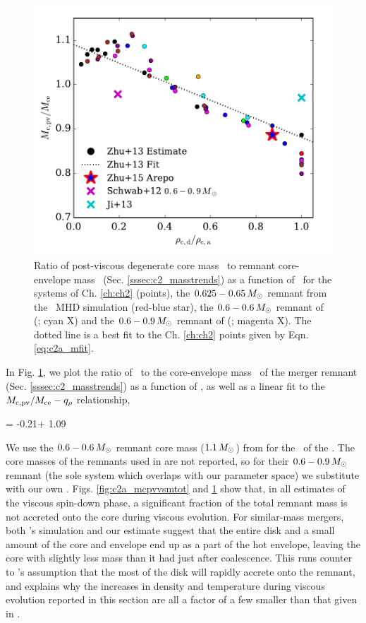 \begin{figure}
\centering
\includegraphics[angle=0,width=0.6\columnwidth]{chapter2_zhu+13/figures/c2a_McMce_vs_qrho.pdf}
\caption{Ratio of post-viscous degenerate core mass \Mcpv\ to remnant core-envelope mass \Mce\ (Sec. \ref{sssec:c2_masstrends}) as a function of \qrho\ for the systems of Ch. \ref{ch:ch2} (points), the $0.625 - 0.65\,\Msun$ remnant from the \arepo\ MHD simulation (red-blue star), the $0.6 - 0.6\,\Msun$ remnant of \citeauthor{ji+13} (\citeyear{ji+13}; cyan X) and the $0.6 - 0.9\,\Msun$ remnant of \citeauthor{schw+12} (\citeyear{schw+12}; magenta X).  The dotted line is a best fit to the Ch. \ref{ch:ch2} points given by Eqn. \ref{eq:c2a_mfit}.}
\label{fig:c2a_mcmce_qrho}
\end{figure}

In Fig. \ref{fig:c2a_mcmce_qrho}, we plot the ratio of \Mcpv\ to the core-envelope mass \Mce\ of the merger remnant (Sec. \ref{sssec:c2_masstrends}) as a function of \qrho, as well as a linear fit to the $\Mcpv/\Mce - \qrho$ relationship, 

\eqbegin
\frac{\Mcpv}{\Mce} = -0.21\qrho + 1.09
\label{eq:c2a_mfit}
\eqend

\noindent We use the $0.6 - 0.6\,\Msun$ remnant core mass ($1.1\,\Msun$) from \citealt{loreig09} for the \Mce\ of the \cite{ji+13}.  The core masses of the remnants used in \cite{schw+12} are not reported, so for their $0.6 - 0.9\,\Msun$ remnant (the sole system which overlaps with our parameter space) we substitute with our own \Mce.  Figs. \ref{fig:c2a_mcpvvsmtot} and \ref{fig:c2a_mcmce_qrho} show that, in all estimates of the viscous spin-down phase, a significant fraction of the total remnant mass is not accreted onto the core during viscous evolution.  For similar-mass mergers, both \cite{ji+13}'s simulation and our estimate suggest that the entire disk and a small amount of the core and envelope end up as a part of the hot envelope, leaving the core with slightly less mass than it had just after coalescence.  This runs counter to \citealt{vkercj10}'s assumption that the most of the disk will rapidly accrete onto the remnant, and explains why the increases in density and temperature during viscous evolution reported in this section are all a factor of a few smaller than that given in \citealt{vkercj10}.

